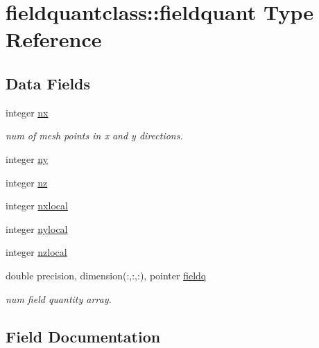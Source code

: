 \hypertarget{structfieldquantclass_1_1fieldquant}{}\section{fieldquantclass\+::fieldquant Type Reference}
\label{structfieldquantclass_1_1fieldquant}
\subsection*{Data Fields}
\begin{DoxyCompactItemize}
\item 
integer \mbox{\hyperlink{structfieldquantclass_1_1fieldquant_a7e825dc6a0487f44528fad55e632cc70}{nx}}
\begin{DoxyCompactList}\small\item\em num of mesh points in x and y directions. \end{DoxyCompactList}\item 
integer \mbox{\hyperlink{structfieldquantclass_1_1fieldquant_a400586052c8deb7240b215eee62b89e9}{ny}}
\item 
integer \mbox{\hyperlink{structfieldquantclass_1_1fieldquant_a6f78161e325887e087580ad729a35d0b}{nz}}
\item 
integer \mbox{\hyperlink{structfieldquantclass_1_1fieldquant_a7caab2ebce71f57176a519933b7e2666}{nxlocal}}
\item 
integer \mbox{\hyperlink{structfieldquantclass_1_1fieldquant_a3c9290ff97ebcaf272c17ed3975a18e1}{nylocal}}
\item 
integer \mbox{\hyperlink{structfieldquantclass_1_1fieldquant_aa91a76fdf699b94c32a92a2b2fa2451d}{nzlocal}}
\item 
double precision, dimension(\+:,\+:,\+:), pointer \mbox{\hyperlink{structfieldquantclass_1_1fieldquant_a3d25be64f02ec3fd9be9700006e6e4f3}{fieldq}}
\begin{DoxyCompactList}\small\item\em num field quantity array. \end{DoxyCompactList}\end{DoxyCompactItemize}


\subsection{Field Documentation}
\mbox{\label{structfieldquantclass_1_1fieldquant_a3d25be64f02ec3fd9be9700006e6e4f3}} 
